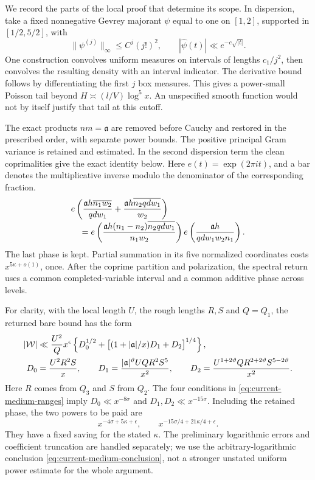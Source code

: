We record the parts of the local proof that determine its scope.  In
dispersion, take a fixed nonnegative Gevrey majorant $\psi$ equal to
one on $[1,2]$, supported in $[1/2,5/2]$, with
\[
 \|\psi^{(j)}\|_\infty\le C^j(j!)^2,
 \qquad |\widehat\psi(t)|\ll e^{-c\sqrt{|t|}}.
\]
One construction convolves uniform measures on intervals of lengths
$c_1/j^2$, then convolves the resulting density with an interval
indicator.  The derivative bound follows by differentiating the first
$j$ box measures.  This gives a power-small Poisson tail beyond
$H\asymp(l/V)\log^5x$.  An unspecified smooth function would not by
itself justify that tail at this cutoff.

The exact products $nm=\mathfrak a$ are removed before Cauchy and
restored in the prescribed order, with separate power bounds.  The
positive principal Gram variance is retained and estimated.  In the
second dispersion term the clean coprimalities give the exact identity
below. Here $e(t)=\exp(2\pi it)$, and a bar denotes the multiplicative
inverse modulo the denominator of the corresponding fraction.
\begin{align}
 &e\left(\frac{\mathfrak a h\overline{n_1w_2}}{qdw_1}
          +\frac{\mathfrak a h\overline{n_2qdw_1}}{w_2}\right)
 \notag\\[-2pt]
 &\quad=
 e\left(\frac{\mathfrak a h(n_1-n_2)
                    \overline{n_2qdw_1}}{n_1w_2}\right)
 e\left(\frac{\mathfrak a h}{qdw_1w_2n_1}\right).
 \label{eq:current-retained-phase}
\end{align}
The last phase is kept.  Partial summation in its five normalized
coordinates costs $x^{5\kappa+o(1)}$, once.  After the coprime
partition and polarization, the spectral return uses a common
completed-variable interval and a common additive phase across levels.

For clarity, with the local length $U$, the rough lengths $R,S$ and
$Q=Q_1$, the returned bare bound has the form
\begin{align}
 |\mathcal W|&\ll \frac{U^2}{Q}x^\epsilon
   \left\{D_0^{1/2}
    +\bigl[(1+|\mathfrak a|/x)D_1+D_2\bigr]^{1/4}\right\},
       \label{eq:current-bare-bound}\\
 D_0&=\frac{U^2R^2S}{x},\qquad
 D_1=\frac{|\mathfrak a|^\vartheta UQR^2S^5}{x^2},\qquad
 D_2=\frac{U^{1+2\vartheta}QR^{2+2\vartheta}S^{5-2\vartheta}}{x^2}.
       \notag
\end{align}
Here $R$ comes from $Q_3$ and $S$ from $Q_2$.  The four conditions in
\eqref{eq:current-medium-ranges} imply
$D_0\ll x^{-8\sigma}$ and $D_1,D_2\ll x^{-15\sigma}$.
Including the retained phase, the two powers to be paid are
\[
 x^{-4\sigma+5\kappa+\epsilon},\qquad
 x^{-15\sigma/4+21\kappa/4+\epsilon}.
\]
They have a fixed saving for the stated $\kappa$.  The preliminary
logarithmic errors and coefficient truncation are handled separately;
we use the arbitrary-logarithmic conclusion
\eqref{eq:current-medium-conclusion}, not a stronger unstated uniform
power estimate for the whole argument.

